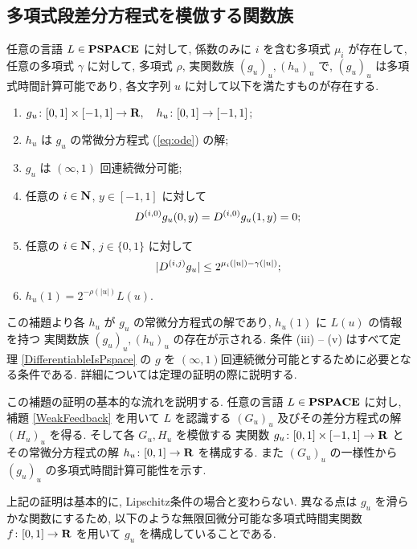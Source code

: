 \subsection{多項式段差分方程式を模倣する関数族}


\begin{lemma}
 \label{DifferentiableFamily}
 任意の言語 $L \in \mathbf{PSPACE}$ に対して, 
 係数のみに $i$ を含む多項式 $\mu_i$ が存在して,
 任意の多項式 $\gamma$ に対して,
 多項式 $\rho$, 実関数族 $(g_u)_u, (h_u)_u$ で, 
 $(g_u)_u$ は多項式時間計算可能であり,
 各文字列 $u$ に対して以下を満たすものが存在する.
 \begin{enumerate}
  \item $g_u\colon [0,1] \times [-1,1]\to \mathbf R, \quad h_u\colon [0,1] \to [-1,1]$;
  \item $h_u$ は $g_u$ の常微分方程式 (\ref{eq:ode}) の解; 
  \item $g_u$ は $(\infty, 1)$ 回連続微分可能;
  \item 任意の $i \in \mathbf N$, $y \in [-1,1]$ に対して
	\begin{equation*}
	 D ^{(i, 0)} g_u(0,y) = D ^{(i, 0)} g_u(1,y) = 0;
	\end{equation*}
  \item \label{enum:infty1}
	任意の $i \in \mathbf N$, $j \in \{0,1\}$ に対して
	\begin{equation*}
	 |D ^{(i,j)} g_u| \leq 2^{\mu_i (|u|) - \gamma(|u|)};
	\end{equation*}
  \item $h_u(1) = 2^{-\rho(|u|)}L(u)$.
 \end{enumerate}
\end{lemma}

 この補題より各 $h_u$ が $g_u$ の常微分方程式の解であり, 
 $h_u(1)$ に $L(u)$ の情報を持つ
 実関数族 $(g_u)_u, (h_u)_u$ の存在が示される.
 条件 (iii) -- (v) はすべて定理 \ref{DifferentiableIsPspace} の $g$ を
 $(\infty, 1)$回連続微分可能とするために必要となる条件である.
 詳細については定理の証明の際に説明する.
 

 この補題の証明の基本的な流れを説明する.
 任意の言語 $L \in \mathbf{PSPACE}$ に対し, 
 補題 \ref{WeakFeedback} を用いて $L$ を認識する $(G_u)_u$ 
 及びその差分方程式の解 $(H_u)_u$ を得る.
 そして各 $G_u, H_u$ を模倣する
 実関数 $g_u \colon [0,1] \times [-1, 1] \to \mathbf R$ 
 とその常微分方程式の解 $h_u \colon [0,1] \to \mathbf R$ を構成する.
 また $(G_u)_u$ の一様性から $(g_u)_u$ の多項式時間計算可能性を示す.


 上記の証明は基本的に, Lipschitz条件の場合と変わらない.
 異なる点は $g_u$ を滑らかな関数にするため, 
 以下のような無限回微分可能な多項式時間実関数 $f \colon [0,1] \to \mathbf R$ を用いて
 $g_u$ を構成していることである.

